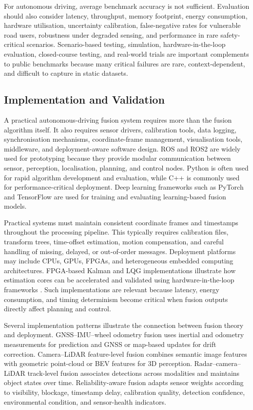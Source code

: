 \documentclass{ieeeaccess}
\begin{document}
For autonomous driving, average benchmark accuracy is not sufficient. Evaluation should also consider latency, throughput, memory footprint, energy consumption, hardware utilisation, uncertainty calibration, false-negative rates for vulnerable road users, robustness under degraded sensing, and performance in rare safety-critical scenarios. Scenario-based testing, simulation, hardware-in-the-loop evaluation, closed-course testing, and real-world trials are important complements to public benchmarks because many critical failures are rare, context-dependent, and difficult to capture in static datasets.

\subsection{Implementation and Validation}

A practical autonomous-driving fusion system requires more than the fusion algorithm itself. It also requires sensor drivers, calibration tools, data logging, synchronisation mechanisms, coordinate-frame management, visualisation tools, middleware, and deployment-aware software design. ROS and ROS2 are widely used for prototyping because they provide modular communication between sensor, perception, localisation, planning, and control nodes. Python is often used for rapid algorithm development and evaluation, while C++ is commonly used for performance-critical deployment. Deep learning frameworks such as PyTorch and TensorFlow are used for training and evaluating learning-based fusion models.

Practical systems must maintain consistent coordinate frames and timestamps throughout the processing pipeline. This typically requires calibration files, transform trees, time-offset estimation, motion compensation, and careful handling of missing, delayed, or out-of-order messages. Deployment platforms may include CPUs, GPUs, FPGAs, and heterogeneous embedded computing architectures. FPGA-based Kalman and LQG implementations illustrate how estimation cores can be accelerated and validated using hardware-in-the-loop frameworks \cite{deliparaschos_fpgabased_2016}. Such implementations are relevant because latency, energy consumption, and timing determinism become critical when fusion outputs directly affect planning and control.

Several implementation patterns illustrate the connection between fusion theory and deployment. GNSS--IMU--wheel odometry fusion uses inertial and odometry measurements for prediction and GNSS or map-based updates for drift correction. Camera--LiDAR feature-level fusion combines semantic image features with geometric point-cloud or BEV features for 3D perception. Radar--camera--LiDAR track-level fusion associates detections across modalities and maintains object states over time. Reliability-aware fusion adapts sensor weights according to visibility, blockage, timestamp delay, calibration quality, detection confidence, environmental condition, and sensor-health indicators.
\end{document}
